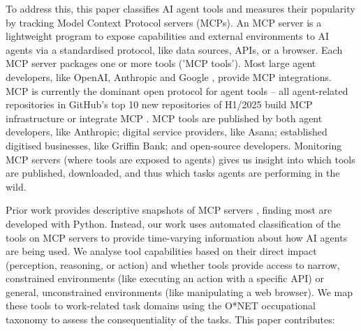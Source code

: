 \documentclass[manuscript,screen,nonacm,oneside]{acmart}
\begin{document}
To address this, this paper classifies AI agent tools and measures their popularity by tracking Model Context Protocol servers (MCPs). An MCP server is a lightweight program to expose capabilities and external environments to AI agents via a standardised protocol, like data sources, APIs, or a browser. Each MCP server packages one or more tools ('MCP tools'). Most large agent developers, like OpenAI, Anthropic and Google \citep{casper2025agent}, provide MCP integrations. MCP is currently the dominant open protocol for agent tools -- all agent-related repositories in GitHub's top 10 new repositories of H1/2025 build MCP infrastructure or integrate MCP \citep{clickhouseClickHouseQuery,hackeroneWhatModel}. MCP tools are published by both agent developers, like Anthropic; digital service providers, like Asana; established digitised businesses, like Griffin Bank; and open-source developers. Monitoring MCP servers (where tools are exposed to agents) gives us insight into which tools are published, downloaded, and thus which tasks agents are performing in the wild.

Prior work provides descriptive snapshots of MCP servers \citep{lin2025large,ray2025survey,hou2025modelcontextprotocolmcp}, finding most are developed with Python. Instead, our work uses automated classification of the tools on MCP servers to provide time-varying information about how AI agents are being used. We analyse tool capabilities based on their direct impact (perception, reasoning, or action) and whether tools provide access to narrow, constrained environments (like executing an action with a specific API) or general, unconstrained environments (like manipulating a web browser). We map these tools to work-related task domains using the O*NET occupational taxonomy to assess the consequentiality of the tasks. This paper contributes:
\end{document}
